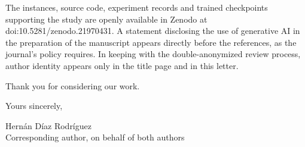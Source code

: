 \documentclass[11pt]{article}
\begin{document}
The instances, source code, experiment records and trained
checkpoints supporting the study are openly available in Zenodo at
doi:10.5281/zenodo.21970431. A statement disclosing the use of
generative AI in the preparation of the manuscript appears directly
before the references, as the journal's policy requires. In keeping
with the double-anonymized review process, author identity appears
only in the title page and in this letter.

Thank you for considering our work.

\vspace{0.7em}
\noindent Yours sincerely,

\vspace{1.2em}
\noindent Hern\'an D\'iaz Rodr\'iguez\\
Corresponding author, on behalf of both authors
\end{document}
